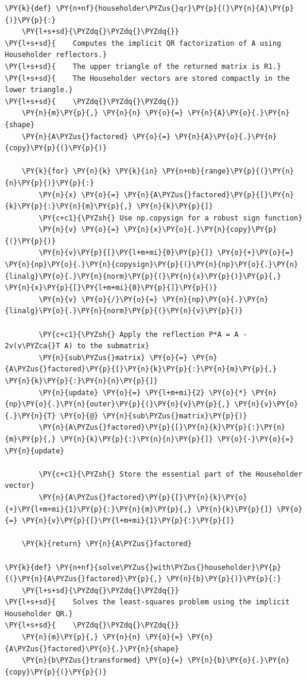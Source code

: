 \begin{verbatim}
\PY{k}{def} \PY{n+nf}{householder\PYZus{}qr}\PY{p}{(}\PY{n}{A}\PY{p}{)}\PY{p}{:}
    \PY{l+s+sd}{\PYZdq{}\PYZdq{}\PYZdq{}}
\PY{l+s+sd}{    Computes the implicit QR factorization of A using Householder reflectors.}
\PY{l+s+sd}{    The upper triangle of the returned matrix is R1.}
\PY{l+s+sd}{    The Householder vectors are stored compactly in the lower triangle.}
\PY{l+s+sd}{    \PYZdq{}\PYZdq{}\PYZdq{}}
    \PY{n}{m}\PY{p}{,} \PY{n}{n} \PY{o}{=} \PY{n}{A}\PY{o}{.}\PY{n}{shape}
    \PY{n}{A\PYZus{}factored} \PY{o}{=} \PY{n}{A}\PY{o}{.}\PY{n}{copy}\PY{p}{(}\PY{p}{)}

    \PY{k}{for} \PY{n}{k} \PY{k}{in} \PY{n+nb}{range}\PY{p}{(}\PY{n}{n}\PY{p}{)}\PY{p}{:}
        \PY{n}{x} \PY{o}{=} \PY{n}{A\PYZus{}factored}\PY{p}{[}\PY{n}{k}\PY{p}{:}\PY{n}{m}\PY{p}{,} \PY{n}{k}\PY{p}{]}
        \PY{c+c1}{\PYZsh{} Use np.copysign for a robust sign function}
        \PY{n}{v} \PY{o}{=} \PY{n}{x}\PY{o}{.}\PY{n}{copy}\PY{p}{(}\PY{p}{)}
        \PY{n}{v}\PY{p}{[}\PY{l+m+mi}{0}\PY{p}{]} \PY{o}{+}\PY{o}{=} \PY{n}{np}\PY{o}{.}\PY{n}{copysign}\PY{p}{(}\PY{n}{np}\PY{o}{.}\PY{n}{linalg}\PY{o}{.}\PY{n}{norm}\PY{p}{(}\PY{n}{x}\PY{p}{)}\PY{p}{,} \PY{n}{x}\PY{p}{[}\PY{l+m+mi}{0}\PY{p}{]}\PY{p}{)}
        \PY{n}{v} \PY{o}{/}\PY{o}{=} \PY{n}{np}\PY{o}{.}\PY{n}{linalg}\PY{o}{.}\PY{n}{norm}\PY{p}{(}\PY{n}{v}\PY{p}{)}

        \PY{c+c1}{\PYZsh{} Apply the reflection P*A = A - 2v(v\PYZca{}T A) to the submatrix}
        \PY{n}{sub\PYZus{}matrix} \PY{o}{=} \PY{n}{A\PYZus{}factored}\PY{p}{[}\PY{n}{k}\PY{p}{:}\PY{n}{m}\PY{p}{,} \PY{n}{k}\PY{p}{:}\PY{n}{n}\PY{p}{]}
        \PY{n}{update} \PY{o}{=} \PY{l+m+mi}{2} \PY{o}{*} \PY{n}{np}\PY{o}{.}\PY{n}{outer}\PY{p}{(}\PY{n}{v}\PY{p}{,} \PY{n}{v}\PY{o}{.}\PY{n}{T} \PY{o}{@} \PY{n}{sub\PYZus{}matrix}\PY{p}{)}
        \PY{n}{A\PYZus{}factored}\PY{p}{[}\PY{n}{k}\PY{p}{:}\PY{n}{m}\PY{p}{,} \PY{n}{k}\PY{p}{:}\PY{n}{n}\PY{p}{]} \PY{o}{-}\PY{o}{=} \PY{n}{update}

        \PY{c+c1}{\PYZsh{} Store the essential part of the Householder vector}
        \PY{n}{A\PYZus{}factored}\PY{p}{[}\PY{n}{k}\PY{o}{+}\PY{l+m+mi}{1}\PY{p}{:}\PY{n}{m}\PY{p}{,} \PY{n}{k}\PY{p}{]} \PY{o}{=} \PY{n}{v}\PY{p}{[}\PY{l+m+mi}{1}\PY{p}{:}\PY{p}{]}

    \PY{k}{return} \PY{n}{A\PYZus{}factored}

\PY{k}{def} \PY{n+nf}{solve\PYZus{}with\PYZus{}householder}\PY{p}{(}\PY{n}{A\PYZus{}factored}\PY{p}{,} \PY{n}{b}\PY{p}{)}\PY{p}{:}
    \PY{l+s+sd}{\PYZdq{}\PYZdq{}\PYZdq{}}
\PY{l+s+sd}{    Solves the least-squares problem using the implicit Householder QR.}
\PY{l+s+sd}{    \PYZdq{}\PYZdq{}\PYZdq{}}
    \PY{n}{m}\PY{p}{,} \PY{n}{n} \PY{o}{=} \PY{n}{A\PYZus{}factored}\PY{o}{.}\PY{n}{shape}
    \PY{n}{b\PYZus{}transformed} \PY{o}{=} \PY{n}{b}\PY{o}{.}\PY{n}{copy}\PY{p}{(}\PY{p}{)}


\end{verbatim}
